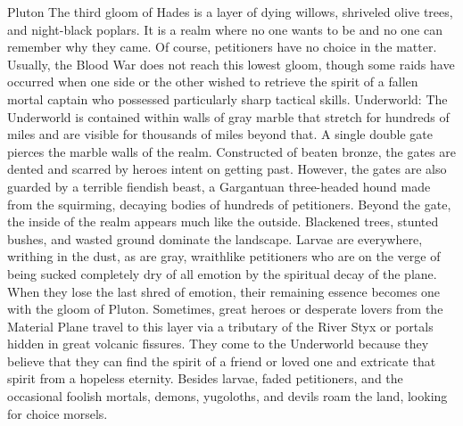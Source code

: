 Pluton
The third gloom of Hades is a layer of dying willows,
shriveled olive trees, and night-black poplars. It is a realm
where no one wants to be and no one can remember why
they came. Of course, petitioners have no choice in the
matter.
Usually, the Blood War does not reach this lowest
gloom, though some raids have occurred when one side or
the other wished to retrieve the spirit of a fallen mortal
captain who possessed particularly sharp tactical skills.
Underworld: The Underworld is contained within
walls of gray marble that stretch for hundreds of miles and
are visible for thousands of miles beyond that. A single
double gate pierces the marble walls of the realm.
Constructed of beaten bronze, the gates are dented and
scarred by heroes intent on getting past. However, the
gates are also guarded by a terrible fiendish beast, a
Gargantuan three-headed hound made from the
squirming, decaying bodies of hundreds of petitioners.
Beyond the gate, the inside of the realm appears much
like the outside. Blackened trees, stunted bushes, and
wasted ground dominate the landscape. Larvae are
everywhere, writhing in the dust, as are gray, wraithlike
petitioners who are on the verge of being sucked
completely dry of all emotion by the spiritual decay of the
plane. When they lose the last shred of emotion, their
remaining essence becomes one with the gloom of Pluton.
Sometimes, great heroes or desperate lovers from the
Material Plane travel to this layer via a tributary of the
River Styx or portals hidden in great volcanic fissures.
They come to the Underworld because they believe that
they can find the spirit of a friend or loved one and
extricate that spirit from a hopeless eternity. Besides
larvae, faded petitioners, and the occasional foolish
mortals, demons, yugoloths, and devils roam the land,
looking for choice morsels.